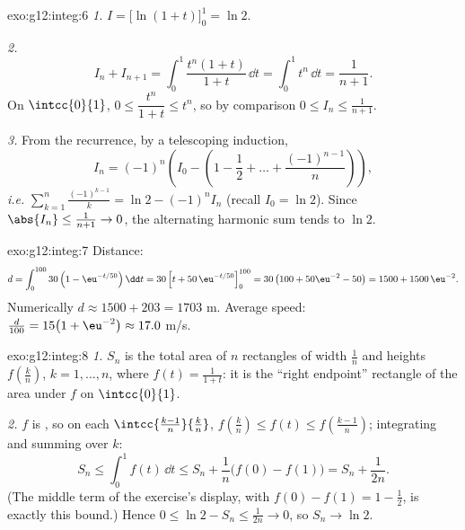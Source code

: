 \begin{solution}{exo:g12:integ:6}
\emph{1.} $I = \bigl[\ln(1+t)\bigr]_0^1 = \ln 2$.

\emph{2.}
\[
I_n + I_{n+1} = \int_0^1 \frac{t^n(1 + t)}{1+t}\,\dd t
= \int_0^1 t^n \,\dd t = \frac{1}{n+1}.
\]
On $\intcc{0}{1}$, $0 \leq \dfrac{t^n}{1+t} \leq t^n$, so by comparison
$0 \leq I_n \leq \frac{1}{n+1}$.

\emph{3.} From the recurrence, by a telescoping induction,
\[
I_n = (-1)^n\left(I_0 - \left(1 - \frac12 + \dots + \frac{(-1)^{n-1}}{n}\right)\right),
\]
\emph{i.e.}
$\displaystyle\sum_{k=1}^{n} \frac{(-1)^{k-1}}{k} = \ln 2 - (-1)^n I_n$
(recall $I_0 = \ln 2$). Since $\abs{I_n} \leq \frac{1}{n+1} \to 0$, the
alternating harmonic sum tends to $\ln 2$.
\end{solution}

\begin{solution}{exo:g12:integ:7}
Distance:
\[
d = \int_0^{100} 30\left(1 - \eu^{-t/50}\right)\dd t
= 30\left[t + 50\,\eu^{-t/50}\right]_0^{100}
= 30\left(100 + 50\eu^{-2} - 50\right)
= 1500 + 1500\,\eu^{-2}.
\]
Numerically $d \approx 1500 + 203 = 1703$ m. Average speed:
$\frac{d}{100} = 15\bigl(1 + \eu^{-2}\bigr) \approx 17.0$ m/s.
\end{solution}

\begin{solution}{exo:g12:integ:8}
\emph{1.} $S_n$ is the total area of $n$ rectangles of width $\frac1n$ and
heights $f\left(\frac kn\right)$, $k = 1, \dots, n$, where
$f(t) = \frac{1}{1+t}$: it is the ``right endpoint'' rectangle 
of the area under $f$ on $\intcc{0}{1}$.

\emph{2.} $f$ is , so on each 
$\intcc{\frac{k-1}{n}}{\frac kn}$,
$f\left(\frac kn\right) \leq f(t) \leq f\left(\frac{k-1}{n}\right)$;
integrating and summing over $k$:
\[
S_n \leq \int_0^1 f(t)\,\dd t \leq S_n + \frac1n\bigl(f(0) - f(1)\bigr)
= S_n + \frac{1}{2n}.
\]
(The middle term of the exercise's display, with
$f(0) - f(1) = 1 - \frac12$, is exactly this bound.) Hence
$0 \leq \ln 2 - S_n \leq \frac{1}{2n} \to 0$, so $S_n \to \ln 2$.
\end{solution}

